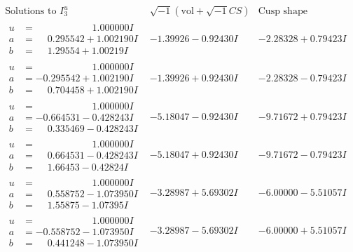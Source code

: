 \documentclass[1p]{elsarticle_modified}
\theoremstyle{definition}
\newcommand{\I}{\sqrt{-1}}
\begin{document}
$$\begin{array}{c|c|c}  
\text{Solutions to }I^u_{3}& \I (\text{vol} + \sqrt{-1}CS) & \text{Cusp shape}\\
 \hline 
\begin{aligned}
u &= \phantom{-0.000000 -}1.000000 I \\
a &= \phantom{-}0.295542 + 1.002190 I \\
b &= \phantom{-}1.29554 + 1.00219 I\end{aligned}
 & -1.39926 - 0.92430 I & -2.28328 + 0.79423 I \\ \hline\begin{aligned}
u &= \phantom{-0.000000 -}1.000000 I \\
a &= -0.295542 + 1.002190 I \\
b &= \phantom{-}0.704458 + 1.002190 I\end{aligned}
 & -1.39926 + 0.92430 I & -2.28328 - 0.79423 I \\ \hline\begin{aligned}
u &= \phantom{-0.000000 -}1.000000 I \\
a &= -0.664531 - 0.428243 I \\
b &= \phantom{-}0.335469 - 0.428243 I\end{aligned}
 & -5.18047 - 0.92430 I & -9.71672 + 0.79423 I \\ \hline\begin{aligned}
u &= \phantom{-0.000000 -}1.000000 I \\
a &= \phantom{-}0.664531 - 0.428243 I \\
b &= \phantom{-}1.66453 - 0.42824 I\end{aligned}
 & -5.18047 + 0.92430 I & -9.71672 - 0.79423 I \\ \hline\begin{aligned}
u &= \phantom{-0.000000 -}1.000000 I \\
a &= \phantom{-}0.558752 - 1.073950 I \\
b &= \phantom{-}1.55875 - 1.07395 I\end{aligned}
 & -3.28987 + 5.69302 I & -6.00000 - 5.51057 I \\ \hline\begin{aligned}
u &= \phantom{-0.000000 -}1.000000 I \\
a &= -0.558752 - 1.073950 I \\
b &= \phantom{-}0.441248 - 1.073950 I\end{aligned}
 & -3.28987 - 5.69302 I & -6.00000 + 5.51057 I \\ \hline\begin{aligned}

\end{aligned}
\end{array}$$
\end{document}
